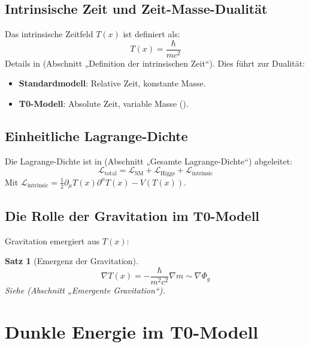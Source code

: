 \documentclass[a4paper,12pt]{article}
\newtheorem{theorem}{Satz}[section]
\theoremstyle{definition}
\theoremstyle{remark}
\newcommand{\Tfield}{T(x)}
\begin{document}
	\subsection{Intrinsische Zeit und Zeit-Masse-Dualität}
	
	Das intrinsische Zeitfeld \(\Tfield\) ist definiert als:
	\begin{equation}
		\Tfield = \frac{\hbar}{m c^2}
	\end{equation}
	Details in \cite{pascher_params_2025} (Abschnitt „Definition der intrinsischen Zeit“). Dies führt zur Dualität:
	\begin{itemize}
		\item \textbf{Standardmodell}: Relative Zeit, konstante Masse.
		\item \textbf{T0-Modell}: Absolute Zeit, variable Masse (\cite{pascher_params_2025}).
	\end{itemize}
	
	\subsection{Einheitliche Lagrange-Dichte}
	
	Die Lagrange-Dichte ist in \cite{pascher_lagrange_2025} (Abschnitt „Gesamte Lagrange-Dichte“) abgeleitet:
	\begin{equation}
		\mathcal{L}_\text{total} = \mathcal{L}_\text{SM} + \mathcal{L}_\text{Higgs} + \mathcal{L}_\text{intrinsic}
	\end{equation}
	Mit \(\mathcal{L}_\text{intrinsic} = \frac{1}{2} \partial_\mu \Tfield \partial^\mu \Tfield - V(\Tfield)\).
	
	\subsection{Die Rolle der Gravitation im T0-Modell}
	
	Gravitation emergiert aus \(\Tfield\):
	\begin{theorem}[Emergenz der Gravitation]
		\begin{equation}
			\nabla \Tfield = -\frac{\hbar}{m^2 c^2} \nabla m \sim \nabla \Phi_g
		\end{equation}
		Siehe \cite{pascher_galaxies_2025} (Abschnitt „Emergente Gravitation“).
	\end{theorem}
	
	\section{Dunkle Energie im T0-Modell}
	
\end{document}
